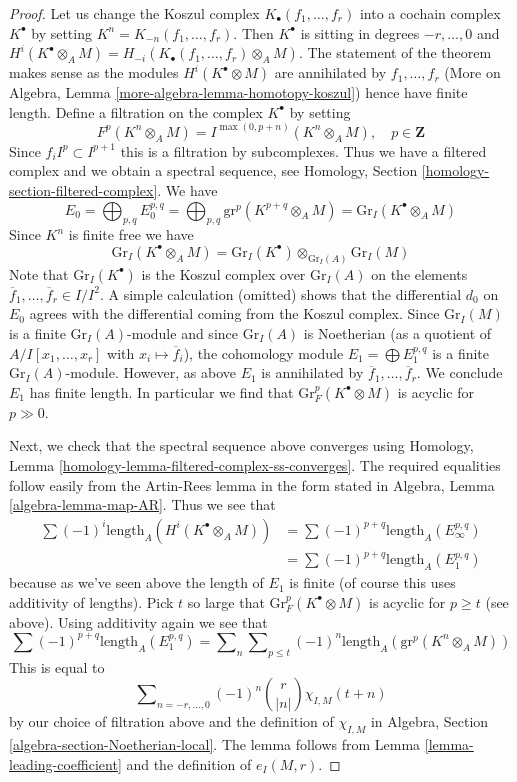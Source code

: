 \begin{proof}
Let us change the Koszul complex $K_\bullet(f_1, \ldots, f_r)$ into a cochain
complex $K^\bullet$ by setting $K^n = K_{-n}(f_1, \ldots, f_r)$.
Then $K^\bullet$ is sitting in degrees $-r, \ldots, 0$ and
$H^i(K^\bullet \otimes_A M) = H_{-i}(K_\bullet(f_1, \ldots, f_r) \otimes_A M)$.
The statement of the theorem makes sense as the modules
$H^i(K^\bullet \otimes M)$ are annihilated by $f_1, \ldots, f_r$
(More on Algebra, Lemma \ref{more-algebra-lemma-homotopy-koszul})
hence have finite length.
Define a filtration on the complex $K^\bullet$ by setting
$$
F^p(K^n \otimes_A M) =
I^{\max(0, p + n)}(K^n \otimes_A M),\quad p \in \mathbf{Z}
$$
Since $f_i I^p \subset I^{p + 1}$ this is a filtration by subcomplexes.
Thus we have a filtered complex and we obtain a spectral sequence, see
Homology, Section \ref{homology-section-filtered-complex}.
We have
$$
E_0 = \bigoplus\nolimits_{p, q} E_0^{p, q} =
\bigoplus\nolimits_{p, q} \text{gr}^p(K^{p + q} \otimes_A M) =
\text{Gr}_I(K^\bullet \otimes_A M)
$$
Since $K^n$ is finite free we have
$$
\text{Gr}_I(K^\bullet \otimes_A M) =
\text{Gr}_I(K^\bullet) \otimes_{\text{Gr}_I(A)} \text{Gr}_I(M)
$$
Note that $\text{Gr}_I(K^\bullet)$ is the Koszul
complex over $\text{Gr}_I(A)$ on the elements
$\overline{f}_1, \ldots, \overline{f}_r \in I/I^2$.
A simple calculation (omitted)
shows that the differential $d_0$ on $E_0$
agrees with the differential coming from the Koszul complex.
Since $\text{Gr}_I(M)$ is a finite $\text{Gr}_I(A)$-module
and since $\text{Gr}_I(A)$ is Noetherian (as a quotient
of $A/I[x_1, \ldots, x_r]$ with $x_i \mapsto \overline{f}_i$), the
cohomology module $E_1 = \bigoplus E_1^{p, q}$
is a finite $\text{Gr}_I(A)$-module. However, as above
$E_1$ is annihilated by $\overline{f}_1, \ldots, \overline{f}_r$.
We conclude $E_1$ has finite length.
In particular we find that $\text{Gr}^p_F(K^\bullet \otimes M)$ is
acyclic for $p \gg 0$.

\medskip\noindent
Next, we check that the spectral sequence above converges
using Homology, Lemma \ref{homology-lemma-filtered-complex-ss-converges}.
The required equalities follow easily from the Artin-Rees lemma
in the form stated in Algebra, Lemma \ref{algebra-lemma-map-AR}.
Thus we see that
\begin{align*}
\sum (-1)^i\text{length}_A(H^i(K^\bullet \otimes_A M))
& =
\sum (-1)^{p + q} \text{length}_A(E_\infty^{p, q}) \\
& =
\sum (-1)^{p + q} \text{length}_A(E_1^{p, q})
\end{align*}
because as we've seen above the length of $E_1$ is finite
(of course this uses additivity of lengths). Pick $t$ so
large that $\text{Gr}^p_F(K^\bullet \otimes M)$
is acyclic for $p \geq t$ (see above). Using
additivity again we see that
$$
\sum (-1)^{p + q} \text{length}_A(E_1^{p, q}) =
\sum\nolimits_n \sum\nolimits_{p \leq t}
(-1)^n \text{length}_A(\text{gr}^p(K^n \otimes_A M))
$$
This is equal to
$$
\sum\nolimits_{n = -r, \ldots, 0} (-1)^n{r \choose |n|} \chi_{I, M}(t + n)
$$
by our choice of filtration above and the definition of $\chi_{I, M}$ in
Algebra, Section \ref{algebra-section-Noetherian-local}.
The lemma follows from Lemma \ref{lemma-leading-coefficient}
and the definition of $e_I(M, r)$.
\end{proof}

